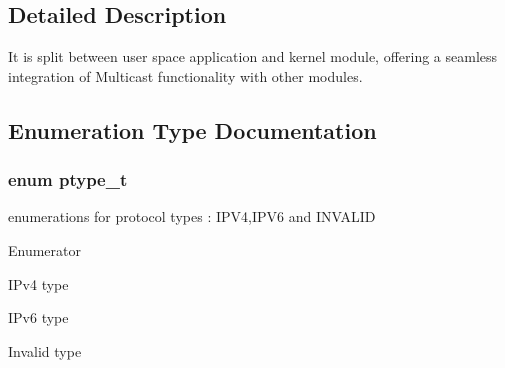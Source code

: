 \subsection{Detailed Description}
It is split between user space application and kernel module, offering a seamless integration of Multicast functionality with other modules. 

\subsection{Enumeration Type Documentation}
\hypertarget{group__FAPI__MCAST_ga723256dea8a6fd9c487829bc1ed6f911}{
\subsubsection[{ptype\-\_\-t}]{\setlength{\rightskip}{0pt plus 5cm}enum {\bf ptype\-\_\-t}}}\label{group__FAPI__MCAST_ga723256dea8a6fd9c487829bc1ed6f911}


enumerations for protocol types \-: I\-P\-V4,I\-P\-V6 and I\-N\-V\-A\-L\-I\-D 

\begin{Desc}
\item[Enumerator]\par
\begin{description}
\item[{\em 
\hypertarget{group__FAPI__MCAST_gga723256dea8a6fd9c487829bc1ed6f911acfc4c1053c60b6cc2a7776c60969f31f}{I\-P\-V4}\label{group__FAPI__MCAST_gga723256dea8a6fd9c487829bc1ed6f911acfc4c1053c60b6cc2a7776c60969f31f}
}]I\-Pv4 type \item[{\em 
\hypertarget{group__FAPI__MCAST_gga723256dea8a6fd9c487829bc1ed6f911aff712168361fe68b2bb6193df4977d3c}{I\-P\-V6}\label{group__FAPI__MCAST_gga723256dea8a6fd9c487829bc1ed6f911aff712168361fe68b2bb6193df4977d3c}
}]I\-Pv6 type \item[{\em 
\hypertarget{group__FAPI__MCAST_gga723256dea8a6fd9c487829bc1ed6f911aef2863a469df3ea6871d640e3669a2f2}{I\-N\-V\-A\-L\-I\-D}\label{group__FAPI__MCAST_gga723256dea8a6fd9c487829bc1ed6f911aef2863a469df3ea6871d640e3669a2f2}
}]Invalid type \end{description}
\end{Desc}


